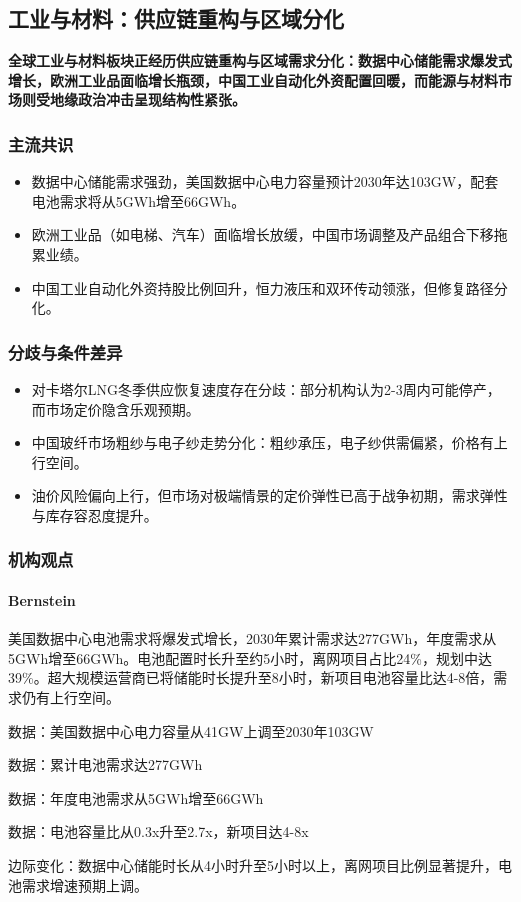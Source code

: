 \documentclass[11pt]{ctexart}
\begin{document}
\subsection{工业与材料：供应链重构与区域分化}
\textbf{全球工业与材料板块正经历供应链重构与区域需求分化：数据中心储能需求爆发式增长，欧洲工业品面临增长瓶颈，中国工业自动化外资配置回暖，而能源与材料市场则受地缘政治冲击呈现结构性紧张。}
\subsubsection*{主流共识}
\begin{itemize}
  \item 数据中心储能需求强劲，美国数据中心电力容量预计2030年达103GW，配套电池需求将从5GWh增至66GWh。
  \item 欧洲工业品（如电梯、汽车）面临增长放缓，中国市场调整及产品组合下移拖累业绩。
  \item 中国工业自动化外资持股比例回升，恒力液压和双环传动领涨，但修复路径分化。
\end{itemize}
\subsubsection*{分歧与条件差异}
\begin{itemize}
  \item 对卡塔尔LNG冬季供应恢复速度存在分歧：部分机构认为2-3周内可能停产，而市场定价隐含乐观预期。
  \item 中国玻纤市场粗纱与电子纱走势分化：粗纱承压，电子纱供需偏紧，价格有上行空间。
  \item 油价风险偏向上行，但市场对极端情景的定价弹性已高于战争初期，需求弹性与库存容忍度提升。
\end{itemize}
\subsubsection*{机构观点}
\paragraph{Bernstein} 美国数据中心电池需求将爆发式增长，2030年累计需求达277GWh，年度需求从5GWh增至66GWh。电池配置时长升至约5小时，离网项目占比24\%，规划中达39\%。超大规模运营商已将储能时长提升至8小时，新项目电池容量比达4-8倍，需求仍有上行空间。
{\small\color{refgray}数据：美国数据中心电力容量从41GW上调至2030年103GW\par}
{\small\color{refgray}数据：累计电池需求达277GWh\par}
{\small\color{refgray}数据：年度电池需求从5GWh增至66GWh\par}
{\small\color{refgray}数据：电池容量比从0.3x升至2.7x，新项目达4-8x\par}
{\small\color{refgray}边际变化：数据中心储能时长从4小时升至5小时以上，离网项目比例显著提升，电池需求增速预期上调。\par}
\end{document}
